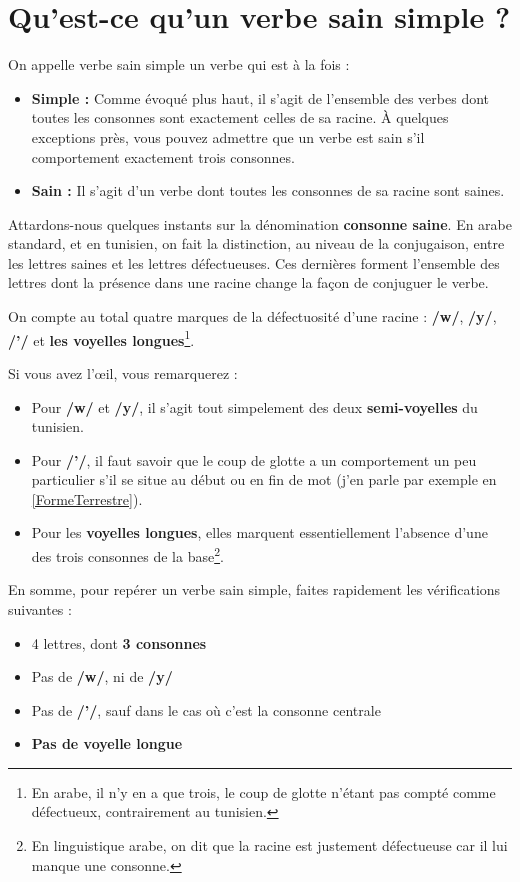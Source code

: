 \section{Qu'est-ce qu'un verbe sain simple ?}
On appelle verbe sain simple un verbe qui est à la fois : 
\begin{itemize}
    \item \textbf{Simple :} Comme évoqué plus haut, il s'agit de l'ensemble des verbes dont toutes les consonnes sont exactement celles de sa racine. À quelques exceptions près, vous pouvez admettre que un verbe est sain s'il comportement exactement trois consonnes.
    \item \textbf{Sain :} Il s'agit d'un verbe dont toutes les consonnes de sa racine sont saines.
\end{itemize}

Attardons-nous quelques instants sur la dénomination \textbf{consonne saine}. En arabe standard, et en tunisien, on fait la distinction, au niveau de la conjugaison, entre les lettres saines et les lettres défectueuses. Ces dernières forment l'ensemble des lettres dont la présence dans une racine change la façon de conjuguer le verbe. 

On compte au total quatre marques de la défectuosité d'une racine : \textbf{/w/}, \textbf{/y/}, \textbf{/'/} et \textbf{les voyelles longues}\footnote{En arabe, il n'y en a que trois, le coup de glotte n'étant pas compté comme défectueux, contrairement au tunisien.}. 

Si vous avez l'\oe il, vous remarquerez : 

\begin{itemize}
    \item Pour \textbf{/w/} et \textbf{/y/}, il s'agit tout simpelement des deux \textbf{semi-voyelles} du tunisien.
    \item Pour \textbf{/'/}, il faut savoir que le coup de glotte a un comportement un peu particulier s'il se situe au début ou en fin de mot (j'en parle par exemple en \ref{FormeTerrestre}).
    \item Pour les \textbf{voyelles longues}, elles marquent essentiellement l'absence d'une des trois consonnes de la base\footnote{En linguistique arabe, on dit que la racine est justement défectueuse car il lui manque une consonne.}.
\end{itemize}

En somme, pour repérer un verbe sain simple, faites rapidement les vérifications suivantes :
\begin{itemize}
    \item 4 lettres, dont \textbf{3 consonnes}
    \item Pas de \textbf{/w/},  ni de \textbf{/y/}
    \item Pas de \textbf{/'/}, sauf dans le cas où c'est la consonne centrale
    \item \textbf{Pas de voyelle longue}

\end{itemize}

